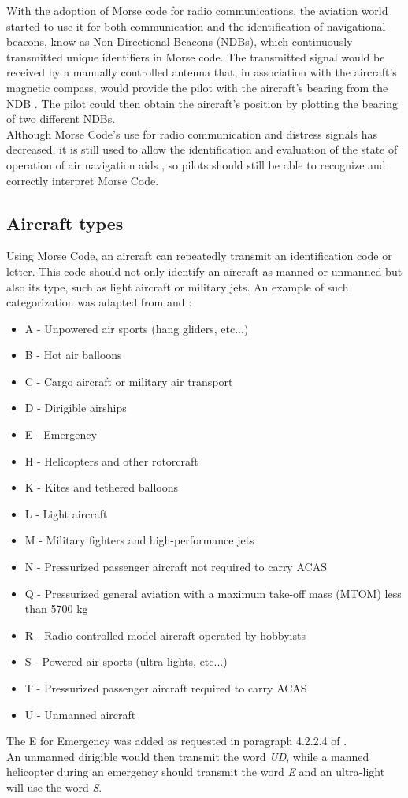With the adoption of Morse code for radio communications, the aviation world started to use it for both communication and the identification of navigational beacons, know as Non-Directional Beacons (NDBs), which continuously transmitted unique identifiers in Morse code. The transmitted signal would be received by a manually controlled antenna that, in association with the aircraft's magnetic compass, would provide the pilot with the aircraft's bearing from the NDB \citep{Nolan2010}. The pilot could then obtain the aircraft's position by plotting the bearing of two different NDBs.\\
Although Morse Code's use for radio communication and distress signals has decreased, it is still used to allow the identification and evaluation of the state of operation of air navigation aids \citep{FederalAviationAdministration2015a}, so pilots should still be able to recognize and correctly interpret Morse Code.
\subsection{Aircraft types}
\label{subsection:aircraftypes}
Using Morse Code, an aircraft can repeatedly transmit an identification code or letter. This code should not only identify an aircraft as manned or unmanned but also its type, such as light aircraft or military jets. An example of such categorization was adapted from \citep{Angelov2012} and \citep{Eurocontrol2010}: 
\begin{itemize}
\item A - Unpowered air sports (hang gliders, etc...)
\item B - Hot air balloons
\item C - Cargo aircraft or military air transport
\item D - Dirigible airships
\item E - Emergency
\item H - Helicopters and other rotorcraft
\item K - Kites and tethered balloons
\item L - Light aircraft
\item M - Military fighters and high-performance jets
\item N - Pressurized passenger aircraft not required to carry ACAS
\item Q - Pressurized general aviation with a maximum take-off mass (MTOM) less than 5700 kg
\item R - Radio-controlled model aircraft operated by hobbyists
\item S - Powered air sports (ultra-lights, etc...)
\item T - Pressurized passenger aircraft required to carry ACAS
\item U - Unmanned aircraft
\end{itemize}
The E for Emergency was added as requested in paragraph 4.2.2.4 of \citep{Eurocontrol2010}.\\
An unmanned dirigible would then transmit the word \textit{UD}, while a manned helicopter during an emergency should transmit the word \textit{E} and an ultra-light will use the word \textit{S}.
